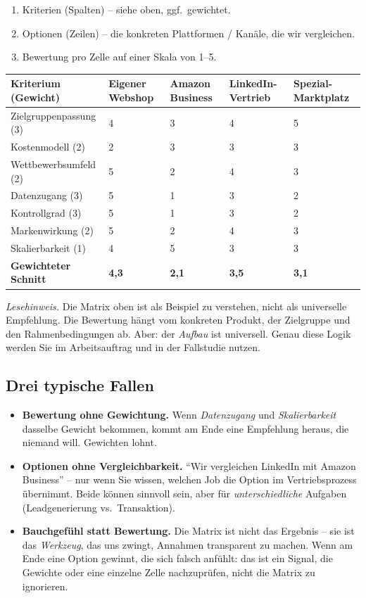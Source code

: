 \documentclass[11pt,a4paper,oneside]{article}
\begin{document}
\begin{enumerate}
  \item Kriterien (Spalten) -- siehe oben, ggf.\ gewichtet.
  \item Optionen (Zeilen) -- die konkreten Plattformen / Kanäle, die wir vergleichen.
  \item Bewertung pro Zelle auf einer Skala von 1--5.
\end{enumerate}

\begin{tabularx}{\linewidth}{@{}lXXXX@{}}
\toprule
\textbf{Kriterium (Gewicht)} & \textbf{Eigener Webshop} & \textbf{Amazon Business} & \textbf{LinkedIn-Vertrieb} & \textbf{Spezial-Marktplatz} \\
\midrule
Zielgruppenpassung (3) & 4 & 3 & 4 & 5 \\
Kostenmodell (2)       & 2 & 3 & 3 & 3 \\
Wettbewerbsumfeld (2)  & 5 & 2 & 4 & 3 \\
Datenzugang (3)        & 5 & 1 & 3 & 2 \\
Kontrollgrad (3)       & 5 & 1 & 3 & 2 \\
Markenwirkung (2)      & 5 & 2 & 4 & 3 \\
Skalierbarkeit (1)     & 4 & 5 & 3 & 3 \\
\midrule
\textbf{Gewichteter Schnitt} & \textbf{4{,}3} & \textbf{2{,}1} & \textbf{3{,}5} & \textbf{3{,}1} \\
\bottomrule
\end{tabularx}

\medskip

\noindent\emph{Lesehinweis.} Die Matrix oben ist als Beispiel zu verstehen, nicht als universelle Empfehlung. Die Bewertung hängt vom konkreten Produkt, der Zielgruppe und den Rahmenbedingungen ab. Aber: der \emph{Aufbau} ist universell. Genau diese Logik werden Sie im Arbeitsauftrag und in der Fallstudie nutzen.

\subsection{Drei typische Fallen}

\begin{itemize}
  \item \textbf{Bewertung ohne Gewichtung.} Wenn \emph{Datenzugang} und \emph{Skalierbarkeit} dasselbe Gewicht bekommen, kommt am Ende eine Empfehlung heraus, die niemand will. Gewichten lohnt.
  \item \textbf{Optionen ohne Vergleichbarkeit.} ``Wir vergleichen LinkedIn mit Amazon Business'' -- nur wenn Sie wissen, welchen Job die Option im Vertriebsprozess übernimmt. Beide können sinnvoll sein, aber für \emph{unterschiedliche} Aufgaben (Leadgenerierung vs.\ Transaktion).
  \item \textbf{Bauchgefühl statt Bewertung.} Die Matrix ist nicht das Ergebnis -- sie ist das \emph{Werkzeug}, das uns zwingt, Annahmen transparent zu machen. Wenn am Ende eine Option gewinnt, die sich falsch anfühlt: das ist ein Signal, die Gewichte oder eine einzelne Zelle nachzuprüfen, nicht die Matrix zu ignorieren.
\end{itemize}
\end{document}
